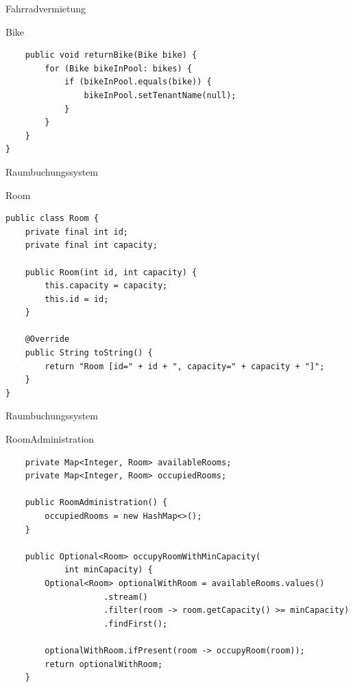 \begin{frame}[fragile]{Fahrradvermietung}
	\begin{exampleblock}{Bike}
 		\begin{lstlisting}
	public void returnBike(Bike bike) {
		for (Bike bikeInPool: bikes) {
			if (bikeInPool.equals(bike)) {
				bikeInPool.setTenantName(null);
			}
		}
	}
}
        \end{lstlisting}
 	\end{exampleblock}
\end{frame}


\begin{frame}[fragile]{Raumbuchungssystem}
	\begin{exampleblock}{Room}
 		\begin{lstlisting}
public class Room {
	private final int id;
	private final int capacity;

	public Room(int id, int capacity) {
		this.capacity = capacity;
		this.id = id;
	}

	@Override
	public String toString() {
		return "Room [id=" + id + ", capacity=" + capacity + "]";
	}
}

        \end{lstlisting}
 	\end{exampleblock}
\end{frame}

\begin{frame}[fragile]{Raumbuchungssystem}
	\begin{exampleblock}{RoomAdministration}
 		\begin{lstlisting}
    private Map<Integer, Room> availableRooms;
	private Map<Integer, Room> occupiedRooms;
	
	public RoomAdministration() {
		occupiedRooms = new HashMap<>();
	}
	
	public Optional<Room> occupyRoomWithMinCapacity(
            int minCapacity) {
		Optional<Room> optionalWithRoom = availableRooms.values()
					.stream()
					.filter(room -> room.getCapacity() >= minCapacity)
					.findFirst();
		
		optionalWithRoom.ifPresent(room -> occupyRoom(room));
		return optionalWithRoom;
	}
        \end{lstlisting}
 	\end{exampleblock}
\end{frame}

